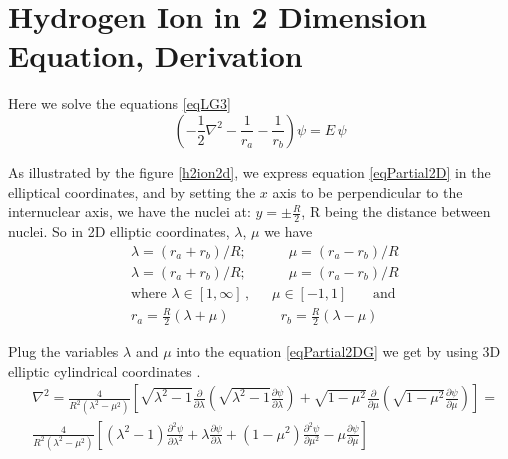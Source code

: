 \chapter{ Hydrogen Ion in 2 Dimension Equation, Derivation }
\label{AppendixC}

Here we solve the equations \eqref{eqLG3}
\begin{equation}\label{eqPartial2DG}
\left(-\frac{1}{2}\nabla^2-\frac{1}{r_a}-\frac{1}{r_b}\right)\psi = E\,\psi
\end{equation}

As illustrated by the figure \ref{h2ion2d}, we express equation \eqref{eqPartial2D} in the elliptical coordinates, and by setting the $ x $ axis to be perpendicular to the internuclear axis, we have the nuclei at: $ y = \pm \frac{R}{2}  $, R being the distance between nuclei. So in  2D elliptic coordinates, $ \lambda $, $ \mu $ we have 
\begin{equation}\label{variables1G}
\begin{split}
& \lambda = \left(r_a + r_b\right)/R;\,\,\,\,\,\,\,\,\,\,\,\,\,\,\,\,\,\,\mu =  \left(r_a - r_b\right)/R  \\[1em]
& \lambda = \left(r_a + r_b\right)/R;\,\,\,\,\,\,\,\,\,\,\,\,\,\,\,\,\,\,\mu =  \left(r_a - r_b\right)/R  \\[1em]
& \text{where } \lambda \in \left[1,\infty\right]\,,\,\,\,\,\,\,\,\,\,\mu \in \left[ -1, 1 \right]\,\,\,\,\,\,\,\,\,\text{ and } \\[.8em] 
& r_a = \frac{R}{2}\left(\lambda + \mu \right)\,\,\,\,\,\,\,\,\,\,\,\,\,\,\,\,\,\,\,\,\,\, r_b = \frac{R}{2}\left(\lambda - \mu \right)
\end{split}
\end{equation}

Plug the variables $ \lambda $ and $ \mu $ into the equation \eqref{eqPartial2DG} we get by using 3D elliptic cylindrical coordinates \cite{MorseFeshbach} .
\begin{equation}
\begin{split}
& \nabla^2 = \frac{4}{ R^2 (\lambda^2-\mu^2) }\left[ \sqrt{\lambda^2-1}\frac{\partial}{\partial \lambda}\left(\sqrt{\lambda^2-1}\frac{\partial \psi}{\partial \lambda} \right) + 
\sqrt{1-\mu^2}\frac{\partial}{\partial \mu}\left(\sqrt{1 - \mu^2}\frac{\partial \psi }{\partial \mu }\right) \right] = \\
& \frac{4}{ R^2 (\lambda^2-\mu^2) }\left[(\lambda^2-1)\frac{\partial^2 \psi}{\partial \lambda^2} + \lambda\frac{\partial \psi}{\partial \lambda} + (
1 - \mu^2)\frac{\partial^2 \psi}{\partial \mu^2} - \mu\frac{\partial \psi}{\partial \mu} \right]
\end{split}
\end{equation}

